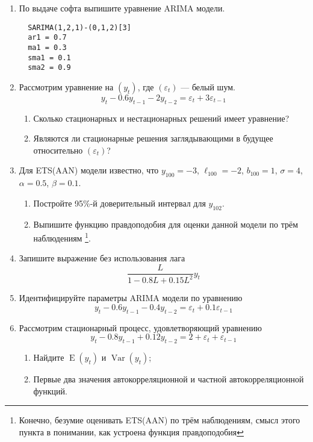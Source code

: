 \documentclass[12pt]{article}
\DeclareMathOperator{\Var}{Var}
\DeclareMathOperator{\E}{E}
\begin{document}

\begin{enumerate}
  \item По выдаче софта выпишите уравнение ARIMA модели.
  \begin{verbatim}
  SARIMA(1,2,1)-(0,1,2)[3]
  ar1 = 0.7
  ma1 = 0.3
  sma1 = 0.1
  sma2 = 0.9
  \end{verbatim}
  \item Рассмотрим уравнение на $(y_t)$, где $(\varepsilon_t)$ — белый шум.
  \[
  y_t - 0.6y_{t-1} - 2y_{t-2} = \varepsilon_t + 3\varepsilon_{t-1}    
  \]
  \begin{enumerate}
      \item Сколько стационарных и нестационарных решений имеет уравнение?
      \item Являются ли стационарные решения заглядывающими в будущее относительно $(\varepsilon_t)$?
  \end{enumerate}
  \item Для ETS(AAN) модели известно, что $y_{100}=-3$, $\ell_{100}=-2$, $b_{100}=1$, 
  $\sigma=4$, $\alpha = 0.5$, $\beta = 0.1$.
  \begin{enumerate}
      \item Постройте 95\%-й доверительный интервал для $y_{102}$.
      \item Выпишите функцию правдоподобия для оценки данной модели по трём наблюдениям
      \footnote{Конечно, безумие оценивать ETS(AAN) по трём наблюдениям, смысл этого пункта в понимании, как устроена функция правдоподобия}.
  \end{enumerate}
  \item Запишите выражение без использования лага 
  \[
      \frac{L}{1-0.8L+0.15L^2} y_t
  \]
  \item Идентифицируйте параметры ARIMA модели по уравнению
  \[
     y_t - 0.6 y_{t-1} - 0.4 y_{t-2} = \varepsilon_t + 0.1 \varepsilon_{t-1}
  \]
  \item Рассмотрим стационарный процесс, удовлетворяющий уравнению
  \[
    y_t - 0.8y_{t-1} + 0.12y_{t-2} = 2 + \varepsilon_t + \varepsilon_{t-1}    
  \]

\begin{enumerate}
    \item Найдите $\E(y_t)$ и $\Var(y_t)$;
    \item Первые два значения автокорреляционной и частной автокорреляционной функций.
\end{enumerate}


\end{enumerate}
\end{document}
